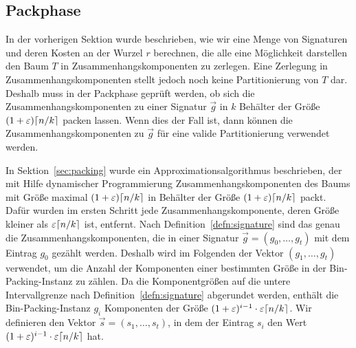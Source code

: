 \subsection{Packphase}\label{sec:packingimpl}
In der vorherigen Sektion wurde beschrieben, wie wir eine Menge von Signaturen und deren Kosten an der Wurzel $r$ berechnen, die alle eine Möglichkeit darstellen den Baum $T$ in Zusammenhangskomponenten zu zerlegen.
Eine Zerlegung in Zusammenhangskomponenten stellt jedoch noch keine Partitionierung von $T$ dar.
Deshalb muss in der Packphase geprüft werden, ob sich die Zusammenhangskomponenten zu einer Signatur $\vec{g}$ in $k$ Behälter der Größe $(1+\varepsilon)\lceil n/k\rceil$ packen lassen.
Wenn dies der Fall ist, dann können die Zusammenhangskomponenten zu $\vec{g}$ für eine valide Partitionierung verwendet werden.

In Sektion~\ref{sec:packing} wurde ein Approximationsalgorithmus beschrieben, der mit Hilfe dynamischer Programmierung Zusammenhangskomponenten des Baums mit Größe maximal $(1+\varepsilon)\lceil n/k\rceil$ in Behälter der Größe $(1+\varepsilon)\lceil n/k\rceil$ packt.
Dafür wurden im ersten Schritt jede Zusammenhangskomponente, deren Größe kleiner als $\varepsilon \lceil n/k\rceil$ ist, entfernt.
Nach Definition~\ref{defn:signature} sind das genau die Zusammenhangskomponenten, die in einer Signatur $\vec{g} = (g_0, \ldots, g_t)$ mit dem Eintrag $g_0$ gezählt werden.
Deshalb wird im Folgenden der Vektor $(g_1, \ldots, g_t)$ verwendet, um die Anzahl der Komponenten einer bestimmten Größe in der Bin-Packing-Instanz zu zählen.
Da die Komponentgrößen auf die untere Intervallgrenze nach Definition~\ref{defn:signature} abgerundet werden, enthält die Bin-Packing-Instanz $g_i$ Komponenten der Größe $(1+\varepsilon)^{i-1} \cdot \varepsilon \lceil n/k\rceil$.
Wir definieren den Vektor $\vec{s} = (s_1, \ldots, s_t)$, in dem der Eintrag $s_i$ den Wert $(1+\varepsilon)^{i-1} \cdot \varepsilon \lceil n/k\rceil$ hat.

